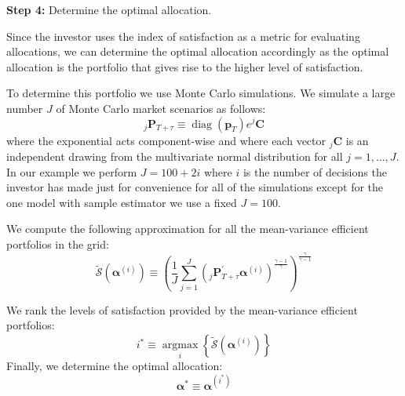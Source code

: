 \documentclass[13pt]{article}
\theoremstyle{definition}
\theoremstyle{remark}
\begin{document}
{\color{C6}\textbf{Step 4:} Determine the optimal allocation.} 

Since the investor uses the index of satisfaction as a metric for evaluating allocations, we can determine the optimal allocation accordingly as the optimal allocation is the portfolio that gives rise to the higher level of satisfaction. 

To determine this portfolio we use Monte Carlo simulations. We simulate a large number $J$ of Monte Carlo market scenarios as follows:
$$
{ }_j \mathbf{P}_{T+\tau} \equiv \operatorname{diag}\left(\mathbf{p}_T\right) e^j \mathbf{C}
$$
where the exponential acts component-wise and where each vector ${ }_j \mathbf{C}$ is an independent drawing from the multivariate normal distribution for all $j=1, \ldots, J$. In our example we perform $J = 100+2i$ where $i$ is the number of decisions the investor has made just for convenience for all of the simulations except for the one model with sample estimator we use a fixed $J=100$.

We compute the following approximation for all the mean-variance efficient portfolios in the grid:
$$
\widetilde{\mathcal{S}}\left(\boldsymbol{\alpha}^{(i)}\right) \equiv \left(\frac{1}{J}\sum_{j=1}^J\left({ }_j \mathbf{P}_{T+\tau}^{\prime} \boldsymbol{\alpha}^{(i)}\right)^{\frac{\gamma-1}{\gamma}}\right)^{\frac{\gamma}{\gamma-1}} 
$$

We rank the levels of satisfaction provided by the mean-variance efficient portfolios:
$$
i^* \equiv \underset{i}{\operatorname{argmax}}\left\{\widetilde{\mathcal{S}}\left(\boldsymbol{\alpha}^{(i)}\right)\right\}
$$
Finally, we determine the optimal allocation:
$$
\boldsymbol{\alpha}^* \equiv \boldsymbol{\alpha}^{\left(i^*\right)}
$$
\end{document}
